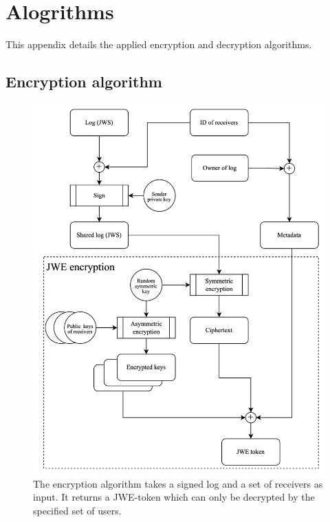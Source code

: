 \documentclass[../main.tex]{subfiles}
\begin{document}
\chapter{Alogrithms}

This appendix details the applied encryption and decryption algorithms.

\section{Encryption algorithm}
\label{app:encryption}
\begin{figure}[h]
    \includegraphics[scale=0.158]{../img/05/encrypt_logs.png}
    \centering
    \caption[Encryption algorithm]{The encryption algorithm takes a signed log and a set of receivers as input. It returns a JWE-token which can only be decrypted by the specified set of users.}
    \label{app:encryption_algo}
\end{figure}
\newpage
\end{document}
